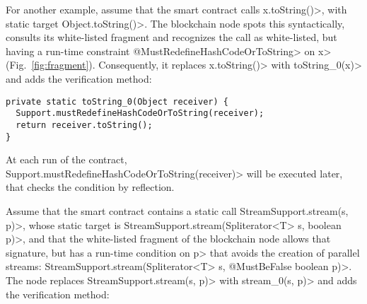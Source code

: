 

For another example, assume that the smart contract calls
\<x.toString()>, with static target \<Object.toString()>.
The blockchain node spots this syntactically,
consults its white-listed fragment and recognizes the call as
white-listed, but having a run-time constraint \<@MustRedefineHashCodeOrToString> on
\<x> (Fig.~\ref{fig:fragment}).
Consequently, it replaces \<x.toString()> with \<toString\_0(x)> and adds
the verification method:

{\small\begin{verbatim}
private static toString_0(Object receiver) {
  Support.mustRedefineHashCodeOrToString(receiver);
  return receiver.toString();
}
\end{verbatim}}

\noindent
At each run of the contract,
\<Support.mustRedefineHashCodeOrToString(receiver)> will be executed later,
that checks the condition by reflection.

Assume that the smart contract contains a static call
\<StreamSupport.stream(s, p)>, whose static target is
\<StreamSupport.stream(Spliterator$\text{<}$T$\text{>}$ s, boolean p)>,
and that the white-listed fragment of the blockchain node allows that signature,
but has a run-time condition on \<p> that avoids the creation of parallel streams:
\<StreamSupport.stream(Spliterator$\text{<}$T$\text{>}$ s, @MustBeFalse boolean p)>.
The node replaces \<StreamSupport.stream(s, p)> with \<stream\_0(s, p)> and adds
the verification method:

